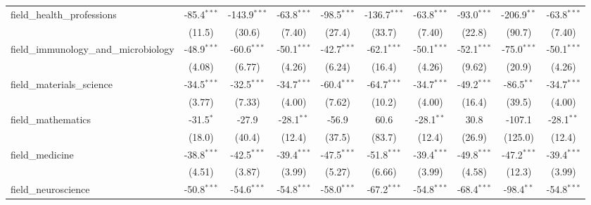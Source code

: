 \begin{tabular}{lccccccccc}
   field\_health\_professions                                  & -85.4$^{***}$  & -143.9$^{***}$ & -63.8$^{***}$ & -98.5$^{***}$  & -136.7$^{***}$ & -63.8$^{***}$ & -93.0$^{***}$  & -206.9$^{**}$  & -63.8$^{***}$\\   
                                                               & (11.5)         & (30.6)         & (7.40)        & (27.4)         & (33.7)         & (7.40)        & (22.8)         & (90.7)         & (7.40)\\   
   field\_immunology\_and\_microbiology                        & -48.9$^{***}$  & -60.6$^{***}$  & -50.1$^{***}$ & -42.7$^{***}$  & -62.1$^{***}$  & -50.1$^{***}$ & -52.1$^{***}$  & -75.0$^{***}$  & -50.1$^{***}$\\   
                                                               & (4.08)         & (6.77)         & (4.26)        & (6.24)         & (16.4)         & (4.26)        & (9.62)         & (20.9)         & (4.26)\\   
   field\_materials\_science                                   & -34.5$^{***}$  & -32.5$^{***}$  & -34.7$^{***}$ & -60.4$^{***}$  & -64.7$^{***}$  & -34.7$^{***}$ & -49.2$^{***}$  & -86.5$^{**}$   & -34.7$^{***}$\\   
                                                               & (3.77)         & (7.33)         & (4.00)        & (7.62)         & (10.2)         & (4.00)        & (16.4)         & (39.5)         & (4.00)\\   
   field\_mathematics                                          & -31.5$^{*}$    & -27.9          & -28.1$^{**}$  & -56.9          & 60.6           & -28.1$^{**}$  & 30.8           & -107.1         & -28.1$^{**}$\\   
                                                               & (18.0)         & (40.4)         & (12.4)        & (37.5)         & (83.7)         & (12.4)        & (26.9)         & (125.0)        & (12.4)\\   
   field\_medicine                                             & -38.8$^{***}$  & -42.5$^{***}$  & -39.4$^{***}$ & -47.5$^{***}$  & -51.8$^{***}$  & -39.4$^{***}$ & -49.8$^{***}$  & -47.2$^{***}$  & -39.4$^{***}$\\   
                                                               & (4.51)         & (3.87)         & (3.99)        & (5.27)         & (6.66)         & (3.99)        & (4.58)         & (12.3)         & (3.99)\\   
   field\_neuroscience                                         & -50.8$^{***}$  & -54.6$^{***}$  & -54.8$^{***}$ & -58.0$^{***}$  & -67.2$^{***}$  & -54.8$^{***}$ & -68.4$^{***}$  & -98.4$^{**}$   & -54.8$^{***}$\\   

\end{tabular}
